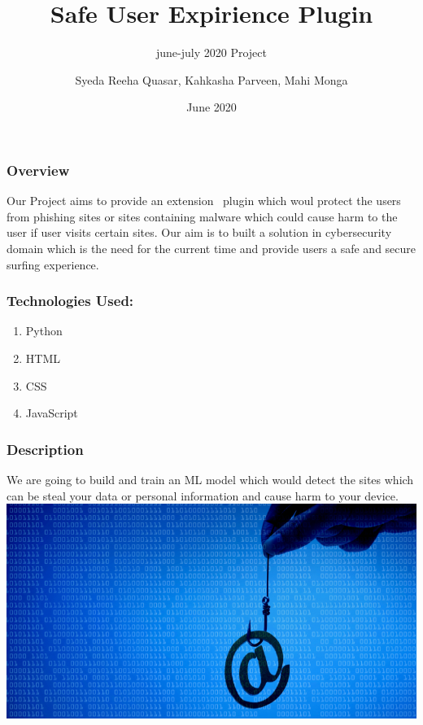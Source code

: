 \documentclass[14pt]{beamer}
\title[SUE]{Safe User Expirience Plugin}
\subtitle{june-july 2020 Project}
\author[Team 36]{Syeda Reeha Quasar, Kahkasha Parveen, Mahi Monga}
\date{June 2020}
\begin{document}
\begin{frame}
    \titlepage
\end{frame}

\begin{frame}
    \frametitle{Overview}
    Our Project aims to provide an extension \ plugin which woul protect the users from phishing sites or sites containing malware which could cause harm to the user if user visits certain sites.
    Our aim is to built a solution in cybersecurity domain which is the need for the current time and provide users a safe and secure surfing experience.
\end{frame}

\begin{frame}
    \frametitle{Technologies Used:}
    \begin{enumerate}
        \item{Python}
        \item{HTML}
        \item{CSS}
        \item{JavaScript}
    \end{enumerate}
\end{frame}

\begin{frame}
    \frametitle{Description}
    We are going to build and train an ML model which would detect the sites which can be steal your data or personal information and cause harm to your device.
    \includegraphics{shutterstock_593626601}
    \href{https://developer.chrome.com/extensions/getstarted}{}
\end{frame}
\end{document}
